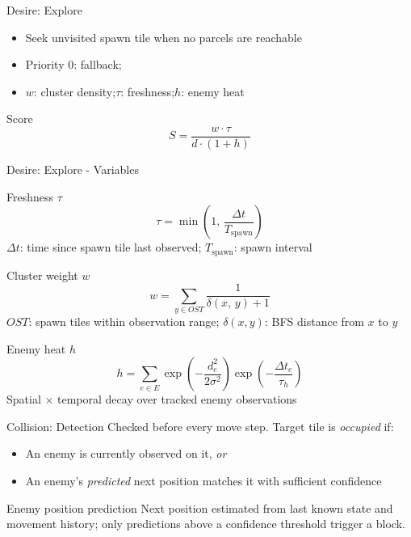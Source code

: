 \begin{frame}{Desire: Explore}
  \begin{itemize}
    \item Seek unvisited spawn tile when no parcels are reachable
    \item Priority 0: fallback;
    \item $w$: cluster density;\quad $\tau$: freshness;\quad $h$: enemy heat
  \end{itemize}
  \begin{block}{Score}
    \[ S = \frac{w \cdot \tau}{d \cdot (1 + h)} \]
  \end{block}
\end{frame}

\begin{frame}{Desire: Explore - Variables}
  \begin{block}{Freshness $\tau$}
    \[ \tau = \min\!\left(1,\, \frac{\Delta t}{T_{\text{spawn}}}\right) \]
    $\Delta t$: time since spawn tile last observed; \quad $T_{\text{spawn}}$: spawn interval
  \end{block}
  \begin{block}{Cluster weight $w$}
    \[ w = \sum_{y \in OST} \frac{1}{\delta(x,\,y)+1} \]
    $OST$: spawn tiles within observation range; \quad $\delta(x, y)$: BFS distance from $x$ to $y$
  \end{block}
  \begin{block}{Enemy heat $h$}
    \[ h = \sum_{e \in E}
         \exp\!\left(-\frac{d_e^2}{2\sigma^2}\right)
         \exp\!\left(-\frac{\Delta t_e}{\tau_h}\right) \]
    Spatial $\times$ temporal decay over tracked enemy observations
  \end{block}
\end{frame}

\begin{frame}{Collision: Detection}
  Checked before every move step. Target tile is \emph{occupied} if:
  \begin{itemize}
    \item An enemy is currently observed on it, \emph{or}
    \item An enemy's \emph{predicted} next position matches it with sufficient confidence
  \end{itemize}
  \begin{block}{Enemy position prediction}
    Next position estimated from last known state and movement history;
    only predictions above a confidence threshold trigger a block.
  \end{block}
\end{frame}

